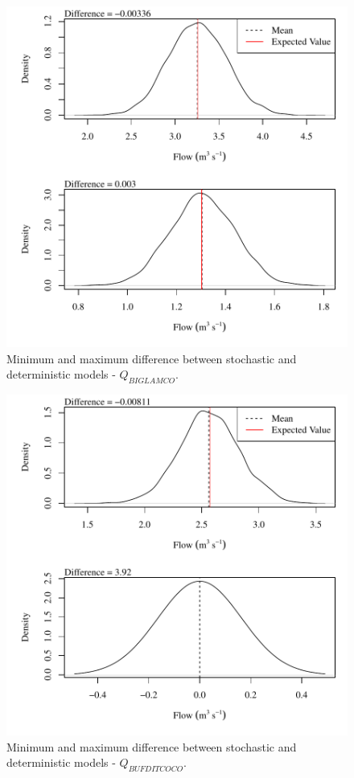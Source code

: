 \begin{center}
\begin{figure}[htbp]
	\includegraphics[width=6in]{"Figures/Results_DSR/V min-max diff qBIG"}
	\caption{Minimum and maximum difference between stochastic and deterministic models - $Q_{BIGLAMCO}$.}
\end{figure}
\end{center}
\newpage

\begin{center}
\begin{figure}[htbp]
	\includegraphics[width=6in]{"Figures/Results_DSR/V min-max diff qBUF"}
	\caption{Minimum and maximum difference between stochastic and deterministic models - $Q_{BUFDITCOCO}$.}
\end{figure}
\end{center}
\newpage

